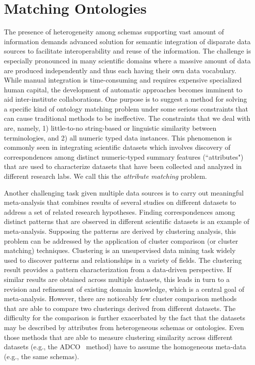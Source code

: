 \section{Matching Ontologies}
The presence of heterogeneity among schemas supporting vast amount of information demands advanced solution for semantic integration of disparate data sources to facilitate interoperability and reuse of the information. The challenge is especially pronounced in many scientific domains where a massive amount of data are produced independently and thus each having their own data vocabulary. While manual integration is time-consuming and requires expensive specialized human capital, the development of automatic approaches becomes imminent to aid inter-institute collaborations. One purpose is to suggest a method for solving a specific kind of ontology matching problem under some serious constraints that can cause traditional methods to be ineffective. The constraints that we deal with are, namely, 1) little-to-no string-based or linguistic similarity between terminologies, and 2) all numeric typed data instances. This phenomenon is commonly seen in integrating scientific datasets which involves discovery of correspondences among distinct numeric-typed summary features (``attributes") that are used to characterize datasets that have been collected and analyzed in different research labs. We call this the \emph{attribute matching} problem.

Another challenging task given multiple data sources is to carry out meaningful meta-analysis that combines results of several studies on different datasets to address a set of related research hypotheses. Finding correspondences among distinct patterns that are observed in different scientific datasets is an example of meta-analysis. Supposing the patterns are derived by clustering analysis, this problem can be addressed by the application of cluster comparison (or cluster matching) techniques. Clustering is an unsupervised data mining task widely used to discover patterns and relationships in a variety of fields. The clustering result provides a pattern characterization from a data-driven perspective. If similar results are obtained across multiple datasets, this leads in turn to a revision and refinement of existing domain knowledge, which is a central goal of meta-analysis. However, there are noticeably few cluster comparison methods that are able to compare two clusterings derived from different datasets. The difficulty for the comparison is further exacerbated by the fact that the datasets may be described by attributes from heterogeneous schemas or ontologies. Even those methods that are able to measure clustering similarity across different datasets (e.g., the ADCO~\cite{Bae2010} method) have to assume the homogeneous meta-data (e.g., the same schemas).

